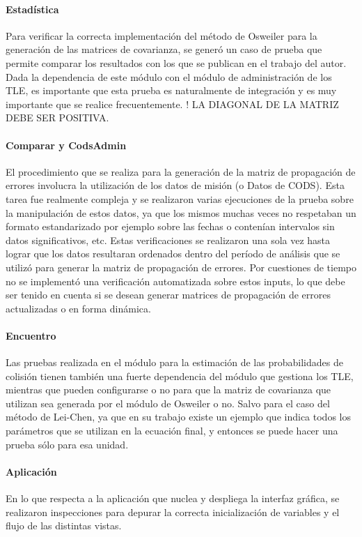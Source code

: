 \paragraph*{Estad\'istica}
Para verificar la correcta implementaci\'on del m\'etodo de Osweiler para la generaci\'on de las matrices de covarianza, se gener\'o un caso de prueba que permite comparar los resultados con los que se publican en el trabajo del autor. Dada la dependencia de este m\'odulo con el m\'odulo de administraci\'on de los TLE, es importante que esta prueba es naturalmente de integraci\'on y es muy importante que se realice frecuentemente. ! LA DIAGONAL DE LA MATRIZ DEBE SER POSITIVA. 

\paragraph*{Comparar y CodsAdmin}
El procedimiento que se realiza para la generaci\'on de la matriz de propagaci\'on de errores involucra la utilizaci\'on de los datos de misi\'on (o Datos de CODS). Esta tarea fue realmente compleja y se realizaron varias ejecuciones de la prueba sobre la manipulaci\'on de estos datos, ya que los mismos muchas veces no respetaban un formato estandarizado por ejemplo sobre las fechas o conten\'ian intervalos sin datos significativos, etc. Estas verificaciones se realizaron una sola vez hasta lograr que los datos resultaran ordenados dentro del per\'iodo de an\'alisis que se utiliz\'o para generar la matriz de propagaci\'on de errores. Por cuestiones de tiempo no se implement\'o una verificaci\'on automatizada sobre estos inputs, lo que debe ser tenido en cuenta si se desean generar matrices de propagaci\'on de errores actualizadas o en forma din\'amica.  

\paragraph*{Encuentro}
Las pruebas realizada en el m\'odulo para la estimaci\'on de las probabilidades de colisi\'on tienen tambi\'en una fuerte dependencia del m\'odulo que gestiona los TLE, mientras que pueden configurarse o no para que la matriz de covarianza que utilizan sea generada por el m\'odulo de Osweiler o no. Salvo para el caso del m\'etodo de Lei-Chen, ya que en su trabajo existe un ejemplo que indica todos los par\'ametros que se utilizan en la ecuaci\'on final, y entonces se puede hacer una prueba s\'olo para esa unidad.

\paragraph{Aplicaci\'on}
En lo que respecta a la aplicaci\'on que nuclea y despliega la interfaz gr\'afica, se realizaron inspecciones para depurar la correcta inicializaci\'on de variables y el flujo de las distintas vistas. 


